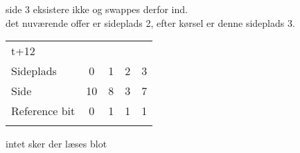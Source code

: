 \documentclass[titlepage]{article}
\begin{document}
side 3 eksistere ikke og swappes derfor ind.\\
det nuværende offer er sideplads 2, efter kørsel er denne sideplads 3.\\


\begin{tabular}{l | c | c | c | c}
t+12\\
Sideplads    & 0 & 1 & 2 & 3\\
Side         & 10 & 8 & 3 & 7\\
Reference bit & 0 & 1 & 1 & 1\\\\
\end{tabular}

intet sker der læses blot\\
\end{document}
